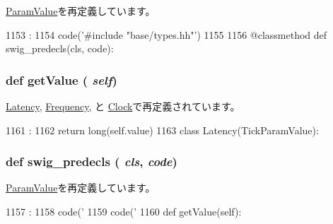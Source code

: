 \hyperlink{classm5_1_1params_1_1ParamValue_a0b408a11a14bd1d770e28f71a6e14ab5}{ParamValue}を再定義しています。


\begin{DoxyCode}
1153                                :
1154         code('#include "base/types.hh"')
1155 
1156     @classmethod
    def swig_predecls(cls, code):
\end{DoxyCode}
\hypertarget{classm5_1_1params_1_1TickParamValue_acc340fbd4335fa34f9d57fb454b28ed0}{
\subsubsection[{getValue}]{\setlength{\rightskip}{0pt plus 5cm}def getValue ( {\em self})}}
\label{classm5_1_1params_1_1TickParamValue_acc340fbd4335fa34f9d57fb454b28ed0}


\hyperlink{classm5_1_1params_1_1Latency_acc340fbd4335fa34f9d57fb454b28ed0}{Latency}, \hyperlink{classm5_1_1params_1_1Frequency_acc340fbd4335fa34f9d57fb454b28ed0}{Frequency}, と \hyperlink{classm5_1_1params_1_1Clock_acc340fbd4335fa34f9d57fb454b28ed0}{Clock}で再定義されています。


\begin{DoxyCode}
1161                       :
1162         return long(self.value)
1163 
class Latency(TickParamValue):
\end{DoxyCode}
\hypertarget{classm5_1_1params_1_1TickParamValue_ab3dbcf5716623eac67a8ccc074fa7e13}{
\subsubsection[{swig\_\-predecls}]{\setlength{\rightskip}{0pt plus 5cm}def swig\_\-predecls ( {\em cls}, \/   {\em code})}}
\label{classm5_1_1params_1_1TickParamValue_ab3dbcf5716623eac67a8ccc074fa7e13}


\hyperlink{classm5_1_1params_1_1ParamValue_ab3dbcf5716623eac67a8ccc074fa7e13}{ParamValue}を再定義しています。


\begin{DoxyCode}
1157                                 :
1158         code('%
1159         code('%
1160 
    def getValue(self):
\end{DoxyCode}


